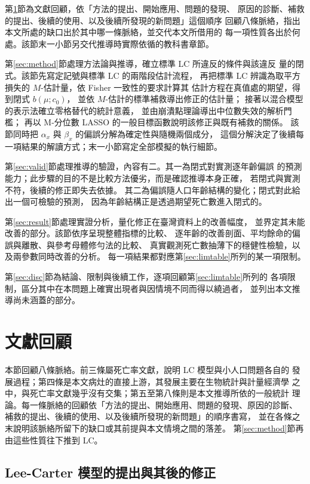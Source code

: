 \documentclass[UTF8, fontset=macnew, a4paper, 12pt]{ctexart}
\begin{document}
第\ref{sec:lit}節為文獻回顧，依「方法的提出、開始應用、問題的發現、
原因的診斷、補救的提出、後續的使用、以及後續所發現的新問題」這個順序
回顧八條脈絡，指出本文所處的缺口出於其中哪一條脈絡，並交代本文所借用的
每一項性質各出於何處。該節末一小節另交代推導時實際依循的教科書章節。

第\ref{sec:method}節處理方法論與推導，確立標準 LC 所違反的條件與該違反
量的閉式。該節先寫定記號與標準 LC 的兩階段估計流程，
再把標準 LC 辨識為取平方損失的 $M$-估計量，依 Fisher 一致性的要求計算其
估計方程在真值處的期望，得到閉式 $b(\mu;c_0)$，
並依 $M$-估計的標準補救導出修正的估計量；
接著以混合模型的表示法確立零格替代的統計意義，
並由崩潰點理論導出中位數失效的解析門檻；
再以 M-分位數 LASSO 的一般目標函數說明該修正與既有補救的關係。
該節同時把 $\alpha_x$ 與 $\beta_x$ 的偏誤分解為確定性與隨機兩個成分，
這個分解決定了後續每一項結果的解讀方式；末一小節寫定全部模擬的執行細節。

第\ref{sec:valid}節處理推導的驗證，內容有二。其一為閉式對實測逐年齡偏誤
的預測能力；此步驟的目的不是比較方法優劣，而是確認推導本身正確，
若閉式與實測不符，後續的修正即失去依據。
其二為偏誤隨人口年齡結構的變化；閉式對此給出一個可檢驗的預測，
因為年齡結構正是透過期望死亡數進入閉式的。

第\ref{sec:result}節處理實證分析，量化修正在臺灣資料上的改善幅度，
並界定其未能改善的部分。該節依序呈現整體指標的比較、
逐年齡的改善剖面、平均餘命的偏誤與離散、與參考母體修勻法的比較、
真實觀測死亡數抽薄下的穩健性檢驗，以及兩參數同時改善的分析。
每一項結果都對應第\ref{sec:limtable}所列的某一項限制。

第\ref{sec:disc}節為結論、限制與後續工作，逐項回顧第\ref{sec:limtable}所列的
各項限制，區分其中在本問題上確實出現者與因情境不同而得以繞過者，
並列出本文推導尚未涵蓋的部分。
\section{文獻回顧}\label{sec:lit}

本節回顧八條脈絡。前三條屬死亡率文獻，說明 LC 模型與小人口問題各自的
發展過程；第四條是本文病灶的直接上游，其發展主要在生物統計與計量經濟學
之中，與死亡率文獻幾乎沒有交集；第五至第八條則是本文推導所依的一般統計
理論。每一條脈絡的回顧依「方法的提出、開始應用、問題的發現、原因的診斷、
補救的提出、後續的使用、以及後續所發現的新問題」的順序書寫，
並在各條之末說明該脈絡所留下的缺口或其前提與本文情境之間的落差。
第\ref{sec:method}節再由這些性質往下推到 LC。

\subsection{Lee-Carter 模型的提出與其後的修正}
\end{document}

